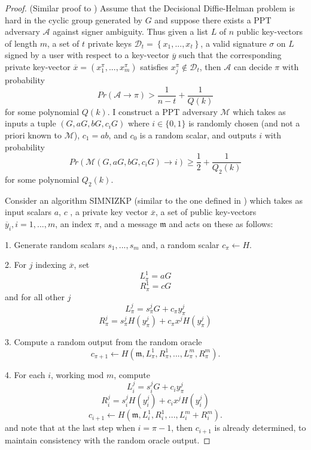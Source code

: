 \documentclass[12pt,oneside,english]{amsart}
\numberwithin{equation}{section}
\numberwithin{figure}{section}
\theoremstyle{plain}
\theoremstyle{plain}
\theoremstyle{remark}
\theoremstyle{plain}
\theoremstyle{remark}
\theoremstyle{remark}
\theoremstyle{plain}
\theoremstyle{definition}
\begin{document}
\begin{proof}
(Similar proof to \cite[Theorem 2]{LWW}) Assume that the Decisional Diffie-Helman problem is hard in the cyclic group generated by $G$ and suppose there exists a PPT
adversary $\mathcal{A}$ against signer ambiguity. Thus given a list
$L$ of $n$ public key-vectors of length $m$, a set of $t$ private
keys $\mathcal{D}_{t}=\left\{ x_{1},...,x_{t}\right\} $, a valid
signature $\sigma$ on $L$ signed by a user with respect to a key-vector
$\overline{y}$ such that the corresponding private key-vector $\overline{x}=\left(x_{1}^{\pi},...,x_{m}^{\pi}\right)$
satisfies $x_{j}^{\pi}\notin\mathcal{D}_{t}$, then $\mathcal{A}$
can decide $\pi$ with probability 
\[
Pr\left(\mathcal{A}\to\pi\right)>\frac{1}{n-t}+\frac{1}{Q\left(k\right)}
\]
 for some polynomial $Q\left(k\right)$. I construct a PPT adversary
$\mathcal{M}$ which takes as inputs a tuple 
$\left(G,aG,bG,c_{i}G\right)$ where $i\in \{0,1\}$ is randomly chosen (and not a priori known to $\mathcal{M}$), $c_{1}=ab$, and $c_{0}$ is a random scalar, and outputs $i$ with probability
\[
Pr\left(\mathcal{M}\left(G, aG,bG,c_{i}G\right)\to i\right)\ge\frac{1}{2}+\frac{1}{Q_{2}\left(k\right)}
\]
 for some polynomial $Q_{2}\left(k\right)$. 

Consider an algorithm SIMNIZKP (similar to the one defined in \cite{FS}) which takes
as input scalars $a$, $c$ , a private key vector $\overline{x}$,
a set of public key-vectors $\overline{y}_{i},i=1,...,m$, an index
$\pi$, and a message $\mathfrak{m}$ and acts on these as follows: 

1. Generate random scalars $s_{1},...,s_{m}$ and, a random scalar
$c_{\pi}\leftarrow H$. 

2. For $j$ indexing $\overline{x}$, set
\[
L_{\pi}^{1}=aG
\]
\[
R_{\pi}^{1}=cG
\]
 and for all other $j$ 
\[
L_{\pi}^{j}=s_{\pi}^{j}G+c_{\pi}y_{\pi}^{j}
\]
\[
R_{\pi}^{j}=s_{\pi}^{j}H\left(y_{\pi}^{j}\right)+c_{\pi}x^{j}H\left(y_{\pi}^{j}\right)
\]

3. Compute a random output from the random oracle 
\[
c_{\pi+1}\leftarrow H\left(\mathfrak{m},L_{\pi}^{1},R_{\pi}^{1},...,L_{\pi}^{m},R_{\pi}^{m}\right).
\]

4. For each $i$, working mod $m$, compute 
\[
L_{i}^{j}=s_{i}^{j}G+c_{i}y_{\pi}^{j}
\]
\[
R_{i}^{j}=s_{i}^{j}H\left(y_{i}^{j}\right)+c_{i}x^{j}H\left(y_{i}^{j}\right)
\]
\[
c_{i+1}\leftarrow H\left(\mathfrak{m},L_{i}^{1},R_{i}^{1},...,L_{i}^{m}+R_{i}^{m}\right).
\]
 and note that at the last step when $i=\pi-1$, then $c_{i+1}$
is already determined, to maintain consistency with the random oracle
output. 


\end{proof}
\end{document}
